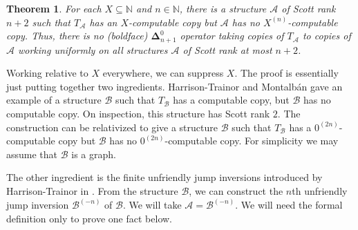 \documentclass[10pt,a4paper]{article}
\newcommand{\Inv}[2]{{#2}^{(-#1)}}
\newcommand{\bfDelta}{\boldsymbol{\Delta}}
\newtheorem{thm}{Theorem}[section]
\theoremstyle{definition}
\begin{document}
	\begin{thm}
		For each $X \subseteq \mathbb{N}$ and $n \in \mathbb{N}$, there is a structure $\mathcal{A}$ of Scott rank $n+2$ such that $T_\mathcal{A}$ has an $X$-computable copy but $\mathcal{A}$ has no $X^{(n)}$-computable copy. Thus, there is no (boldface) $\bfDelta^0_{n+1}$ operator taking copies of $T_\mathcal{A}$ to copies of $\mathcal{A}$ working uniformly on all structures $\mathcal{A}$ of Scott rank at most $n+2$. 
	\end{thm}
	
	Working relative to $X$ everywhere, we can suppress $X$. The proof is essentially just putting together two ingredients. Harrison-Trainor and Montalb\'{a}n \cite{HTMontalban} gave an example of a structure $\mathcal{B}$ such that $T_\mathcal{B}$ has a computable copy, but $\mathcal{B}$ has no computable copy. On inspection, this structure has Scott rank $2$. The construction can be relativized to give a structure $\mathcal{B}$ such that $T_\mathcal{B}$ has a $0^{(2n)}$-computable copy but $\mathcal{B}$ has no $0^{(2n)}$-computable copy. For simplicity we may assume that $\mathcal{B}$ is a graph.
	
	The other ingredient is the finite unfriendly jump inversions introduced by Harrison-Trainor in \cite{unfriendly}. From the structure $\mathcal{B}$, we can construct the $n$th unfriendly jump inversion $\Inv{n}{\mathcal{B}}$ of $\mathcal{B}$. We will take $\mathcal{A} = \Inv{n}{\mathcal{B}}$. We will need the formal definition only to prove one fact below.
	
\end{document}
